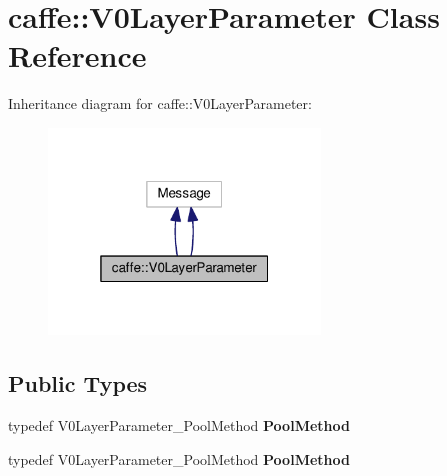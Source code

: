 \hypertarget{classcaffe_1_1_v0_layer_parameter}{}\section{caffe\+:\+:V0\+Layer\+Parameter Class Reference}
\label{classcaffe_1_1_v0_layer_parameter}


Inheritance diagram for caffe\+:\+:V0\+Layer\+Parameter\+:
\nopagebreak
\begin{figure}[H]
\begin{center}
\leavevmode
\includegraphics[width=205pt]{classcaffe_1_1_v0_layer_parameter__inherit__graph}
\end{center}
\end{figure}
\subsection*{Public Types}
\begin{DoxyCompactItemize}
\item 
\mbox{\label{classcaffe_1_1_v0_layer_parameter_a800b2ca69ec61527982c0435881fffbe}} 
typedef V0\+Layer\+Parameter\+\_\+\+Pool\+Method {\bfseries Pool\+Method}
\item 
\mbox{\label{classcaffe_1_1_v0_layer_parameter_a800b2ca69ec61527982c0435881fffbe}} 
typedef V0\+Layer\+Parameter\+\_\+\+Pool\+Method {\bfseries Pool\+Method}
\end{DoxyCompactItemize}
